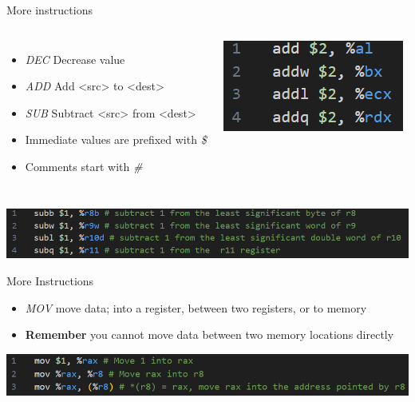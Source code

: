 \documentclass[
	11pt, %
	aspectratio=169, %
]{beamer}
\begin{document}
\begin{frame}{More instructions}{\sectiontitle}
    \begin{columns}
        \begin{itemize}
            \item \textit{DEC} Decrease value
            \item \textit{ADD} Add <src> to <dest>
            \item \textit{SUB} Subtract <src> from <dest>
            \item Immediate values are prefixed with \textit{\$}
            \item Comments start with \textit{\#}
        \end{itemize}
        \includegraphics[]{./images/gas-att-add.png}
    \end{columns}
    \vspace{1cm}
    \includegraphics[scale=0.75]{./images/gas-att-sub.png}
\end{frame}


\begin{frame}{More Instructions}{\sectiontitle}
    \begin{itemize}
        \item \textit{MOV} move data; into a register, between two registers, or to memory
        \item \textbf{Remember} you cannot move data between two memory locations directly
    \end{itemize}
    \vspace{1cm}
    \includegraphics[width=\textwidth]{./images/gas-att-mov.png}
\end{frame}
\end{document}
